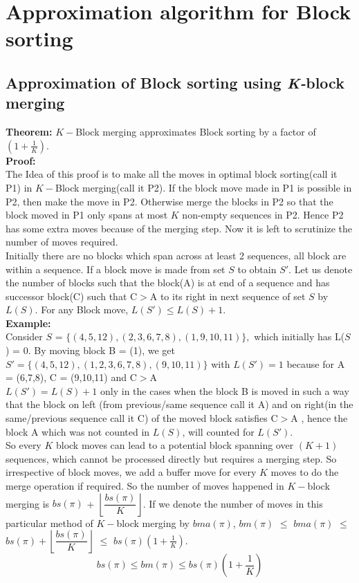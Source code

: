 \documentclass[BTech]{iitmdiss}
\begin{document}
\chapter{Approximation algorithm for Block sorting}
\section{Approximation of Block sorting using \textit{K-}block merging}
\textbf{Theorem:} $K-$Block merging approximates Block sorting by a factor of $(1+\frac{1}{K})$.\\
\textbf{Proof:}\\
The Idea of this proof is to make all the moves in optimal block sorting(call it P1) in $K-$Block merging(call it P2). If the block move made in P1 is possible in P2, then make the move in P2. Otherwise merge the blocks in P2 so that the block moved in P1 only spans at most $K$ non-empty sequences in P2. Hence P2 has some extra moves because of the merging step. Now it is left to scrutinize the number of moves required.\\
Initially there are no blocks which span across at least 2 sequences, all block are within a sequence. If a block move is made from set $S$ to obtain $S'$. Let us denote the number of blocks such that the block(A) is at end of a sequence and has successor block(C) such that C$>$A to its right in next sequence of set $S$ by $L(S)$. For any Block move, $L(S') \leq L(S) + 1.$\\
\textbf{Example:}\\
Consider $S$ = $\{(4,5,12),(2,3,6,7,8),(1,9,10,11)\},$ which initially has L($S$) = 0. By moving block B = (1), we get $S' = \{(4,5,12),(1,2,3,6,7,8),(9,10,11)\}$ with $L(S') = 1$ because for A = (6,7,8), C = (9,10,11) and C$>$A \\
$L(S') = L(S) + 1$ only in the cases when the block B is moved in such a way that the block on left (from previous/same sequence call it A) and on right(in the same/previous sequence call it C) of the moved block satisfies C$>$A , hence the block A which was not counted in $L(S)$, will counted for $L(S')$.\\
So every $K$ block moves can lead to a potential block spanning over $(K+1)$ sequences, which cannot be processed directly but requires a merging step. So irrespective of block moves, we add a buffer move for every $K$ moves to do the merge operation if required. So the number of moves happened in $K-$block merging is $bs(\pi)$ + $\left\lfloor\dfrac{bs(\pi)}{K}\right\rfloor$. If we denote the number of moves in this particular method of $K-$block merging by $bma(\pi)$, $bm(\pi)$ $\leq$  $bma(\pi)$ $\leq$  $bs(\pi) + \left\lfloor\dfrac{bs(\pi)}{K}\right\rfloor$ $\leq$ $bs(\pi)(1+\frac{1}{K})$.
$$bs(\pi) \leq bm(\pi) \leq bs(\pi)(1+\frac{1}{K})$$
\end{document}
